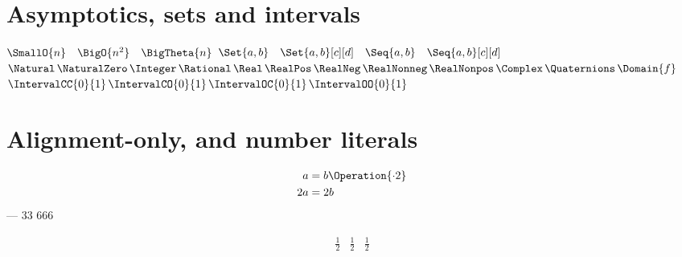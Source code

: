 \documentclass[12pt]{dgs}
\begin{document}
\section*{Asymptotics, sets and intervals}
$\SmallO{n} \quad \BigO{n^2} \quad \BigTheta{n}$
$\Set{a, b} \quad \Set{a, b}[c][d] \quad \Seq{a, b} \quad \Seq{a, b}[c][d]$
$\Natural \, \NaturalZero \, \Integer \, \Rational \, \Real \, \RealPos \, \RealNeg \,
 \RealNonneg \, \RealNonpos \, \Complex \, \Quaternions \, \Domain{f}$
$\IntervalCC{0}{1} \, \IntervalCO{0}{1} \, \IntervalOC{0}{1} \, \IntervalOO{0}{1}$

\section*{Alignment-only, and number literals}
$$
\begin{aligned}
    a &= b \Operation{\cdot 2} \\
    2a &= 2b
\end{aligned}
$$
 --- 33\OneThird{} 666\TwoThirds{} \OneHalf{} \OneQuarter{} \ThreeQuarters{}
\OneEighth{} \ThreeEighths{} \FiveEighths{} \SevenEighths{}

$$
\begin{array}{LCR}
    \frac{1}{2} & \frac{1}{2} & \frac{1}{2}
\end{array}
$$
\end{document}
